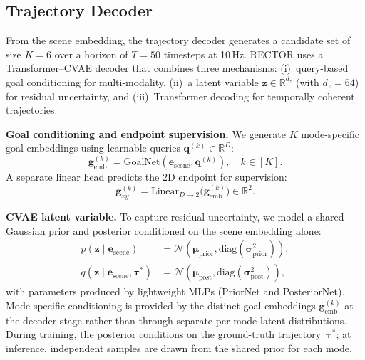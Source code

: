 \subsection{Trajectory Decoder}
\label{subsec:trajectory_decoder}

From the scene embedding, the trajectory decoder generates a candidate set of size $K{=}6$ over a horizon of $T{=}50$ timesteps at 10\,Hz.  RECTOR uses a Transformer--CVAE decoder that combines three mechanisms: (i)~query-based goal conditioning for multi-modality, (ii)~a latent variable $\mathbf{z}\in\mathbb{R}^{d_z}$ (with $d_z{=}64$) for residual uncertainty, and (iii)~Transformer decoding for temporally coherent trajectories.

\textbf{Goal conditioning and endpoint supervision.}
We generate $K$ mode-specific goal embeddings using learnable queries $\mathbf{q}^{(k)}\in\mathbb{R}^{D}$:
\begin{equation}
\mathbf{g}_{\text{emb}}^{(k)} = \text{GoalNet}(\mathbf{e}_{\text{scene}}, \mathbf{q}^{(k)}), \quad k\in[K].
\end{equation}
A separate linear head predicts the 2D endpoint for supervision:
\begin{equation}
\mathbf{g}_{xy}^{(k)} = \text{Linear}_{D\to 2}\big(\mathbf{g}_{\text{emb}}^{(k)}\big)\in\mathbb{R}^{2}.
\end{equation}

\textbf{CVAE latent variable.}
To capture residual uncertainty, we model a shared Gaussian prior and posterior conditioned on the scene embedding alone:
\begin{align}
p(\mathbf{z}\mid \mathbf{e}_{\text{scene}}) &=
\mathcal{N}(\boldsymbol{\mu}_{\text{prior}}, \text{diag}(\boldsymbol{\sigma}^2_{\text{prior}})), \\
q(\mathbf{z}\mid \mathbf{e}_{\text{scene}},\boldsymbol{\tau}^{*}) &=
\mathcal{N}(\boldsymbol{\mu}_{\text{post}}, \text{diag}(\boldsymbol{\sigma}^2_{\text{post}})),
\end{align}
with parameters produced by lightweight MLPs (PriorNet and PosteriorNet). Mode-specific conditioning is provided by the distinct goal embeddings $\mathbf{g}_{\text{emb}}^{(k)}$ at the decoder stage rather than through separate per-mode latent distributions. During training, the posterior conditions on the ground-truth trajectory~$\boldsymbol{\tau}^{*}$; at inference, independent samples are drawn from the shared prior for each mode.

